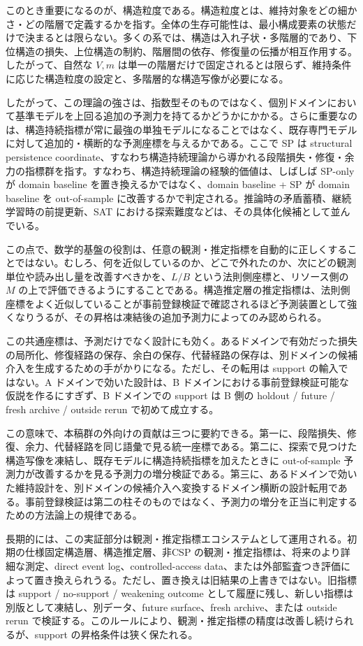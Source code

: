 \documentclass[12pt,a4paper]{article}
\begin{document}
このとき重要になるのが、構造粒度である。構造粒度とは、維持対象をどの細かさ・どの階層で定義するかを指す。全体の生存可能性は、最小構成要素の状態だけで決まるとは限らない。多くの系では、構造は入れ子状・多階層的であり、下位構造の損失、上位構造の制約、階層間の依存、修復量の伝播が相互作用する。したがって、自然な \(V,m\) は単一の階層だけで固定されるとは限らず、維持条件に応じた構造粒度の設定と、多階層的な構造写像が必要になる。

したがって、この理論の強さは、指数型そのものではなく、個別ドメインにおいて基準モデルを上回る追加の予測力を持てるかどうかにかかる。さらに重要なのは、構造持続指標が常に最強の単独モデルになることではなく、既存専門モデルに対して追加的・横断的な予測座標を与えるかである。ここで SP は structural persistence coordinate、すなわち構造持続理論から導かれる段階損失・修復・余力の指標群を指す。すなわち、構造持続理論の経験的価値は、しばしば SP-only が domain baseline を置き換えるかではなく、domain baseline + SP が domain baseline を out-of-sample に改善するかで判定される。推論時の矛盾蓄積、継続学習時の前提更新、SAT における探索難度などは、その具体化候補として並んでいる。

この点で、数学的基盤の役割は、任意の観測・推定指標を自動的に正しくすることではない。むしろ、何を近似しているのか、どこで外れたのか、次にどの観測単位や読み出し量を改善すべきかを、\(L/B\) という法則側座標と、リソース側の \(M\) の上で評価できるようにすることである。構造推定層の推定指標は、法則側座標をよく近似していることが事前登録検証で確認されるほど予測装置として強くなりうるが、その昇格は凍結後の追加予測力によってのみ認められる。

この共通座標は、予測だけでなく設計にも効く。あるドメインで有効だった損失の局所化、修復経路の保存、余白の保存、代替経路の保存は、別ドメインの候補介入を生成するための手がかりになる。ただし、その転用は support の輸入ではない。A ドメインで効いた設計は、B ドメインにおける事前登録検証可能な仮説を作るにすぎず、B ドメインでの support は B 側の holdout / future / fresh archive / outside rerun で初めて成立する。

この意味で、本稿群の外向けの貢献は三つに要約できる。第一に、段階損失、修復、余力、代替経路を同じ語彙で見る統一座標である。第二に、探索で見つけた構造写像を凍結し、既存モデルに構造持続指標を加えたときに out-of-sample 予測力が改善するかを見る予測力の増分検証である。第三に、あるドメインで効いた維持設計を、別ドメインの候補介入へ変換するドメイン横断の設計転用である。事前登録検証は第二の柱そのものではなく、予測力の増分を正当に判定するための方法論上の規律である。

長期的には、この実証部分は観測・推定指標エコシステムとして運用される。初期の仕様固定構造層、構造推定層、非CSP の観測・推定指標は、将来のより詳細な測定、direct event log、controlled-access data、または外部監査つき評価によって置き換えられうる。ただし、置き換えは旧結果の上書きではない。旧指標は support / no-support / weakening outcome として履歴に残し、新しい指標は別版として凍結し、別データ、future surface、fresh archive、または outside rerun で検証する。このルールにより、観測・推定指標の精度は改善し続けられるが、support の昇格条件は狭く保たれる。
\end{document}
